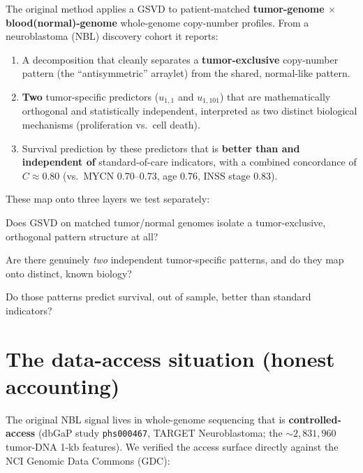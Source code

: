 \documentclass[11pt]{article}
\begin{document}
The original method applies a GSVD to patient-matched
\textbf{tumor-genome $\times$ blood(normal)-genome} whole-genome copy-number
profiles. From a neuroblastoma (NBL) discovery cohort it reports:

\begin{enumerate}[leftmargin=*]
  \item A decomposition that cleanly separates a \textbf{tumor-exclusive}
    copy-number pattern (the ``antisymmetric'' arraylet) from the shared,
    normal-like pattern.
  \item \textbf{Two} tumor-specific predictors ($u_{1,1}$ and $u_{1,101}$) that
    are mathematically orthogonal and statistically independent, interpreted as
    two distinct biological mechanisms (proliferation vs.\ cell death).
  \item Survival prediction by these predictors that is \textbf{better than and
    independent of} standard-of-care indicators, with a combined concordance of
    $C \approx 0.80$ (vs.\ MYCN $0.70$--$0.73$, age $0.76$, INSS stage $0.83$).
\end{enumerate}

These map onto three layers we test separately:

\begin{description}[leftmargin=1.5cm]
  \item[Layer 1 --- Geometry.] Does GSVD on matched tumor/normal genomes isolate
    a tumor-exclusive, orthogonal pattern structure at all?
  \item[Layer 2 --- Two-mechanism structure.] Are there genuinely \emph{two}
    independent tumor-specific patterns, and do they map onto distinct, known
    biology?
  \item[Layer 3 --- Prognosis.] Do those patterns predict survival, out of
    sample, better than standard indicators?
\end{description}

\section{The data-access situation (honest accounting)}

The original NBL signal lives in whole-genome sequencing that is
\textbf{controlled-access} (dbGaP study \texttt{phs000467}, TARGET
Neuroblastoma; the $\sim 2{,}831{,}960$ tumor-DNA 1-kb features). We verified the
access surface directly against the NCI Genomic Data Commons (GDC):
\end{document}
